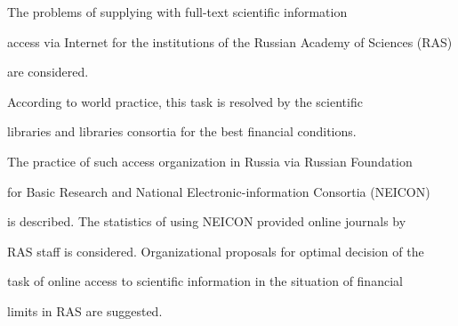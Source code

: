 \def\rightkol{ENGLISH ABSTRACTS}





\noindent


The problems of supplying with full-text scientific information 


access via Internet for the institutions of the Russian Academy of Sciences (RAS)


are considered. 


According to world practice, this task is resolved by the scientific 


libraries and libraries consortia for the best financial conditions. 


The practice of such access organization in Russia via Russian Foundation 


for Basic Research and National Electronic-information Consortia (NEICON) 


is described. The statistics of using NEICON provided online journals by 


RAS staff is considered. Organizational proposals for optimal decision of the 


task of online access to scientific information in the situation of financial 


limits in RAS are suggested.


 





\vspace*{-5pt}






















\def\tit{DECISION SUPPORT SYSTEMS MODELING


WITH SYNERGETIC ARTIFICIAL INTELLIGENCE}





\def\aut{I.\,A.~Kirikov$^1$, A.\,V.~Kolesnikov$^2$, and~S.\,V.~Listopad$^3$} 








